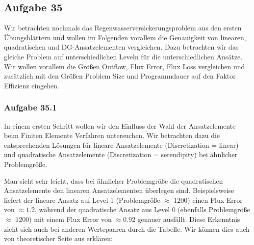 \subsection{Aufgabe 35}
Wir betrachten nochmals das Regenwasserversickerungsproblem aus den ersten Übungsblättern und wollen im Folgenden vorallem die Genauigkeit von linearen, quadratischen und DG-Ansatzelementen
vergleichen. Dazu betrachten wir das gleiche Problem auf unterschiedlichen Leveln für die unterschiedlichen Ansätze. Wir  wollen vorallem die Größen Outflow, Flux Error, Flux Loss vergleichen und zusätzlich mit den Größen Problem Size und Programmdauer auf den Faktor Effizienz eingehen.

\subsubsection{Aufgabe 35.1}
In einem ersten Schritt wollen wir den Einfluss der Wahl der Ansatzelemente beim Finiten Elemente Verfahren untersuchen.
Wir betrachten dazu die entsprechenden Lösungen für lineare Ansatzelemente (Discretization = linear) und quadratische Ansatzelemente (Discretization = serendipity) bei ähnlicher Problemgröße.
\begin{figure}[H]
	\centering
\end{figure}

\begin{figure}[H]
	\centering
\end{figure}
Man sieht sehr leicht, dass bei ähnlicher Problemgröße die quadratischen Ansatzelemente den linearen Ansatzelementen überlegen sind. Beispielsweise liefert der lineare Ansatz auf Level 1 (Problemgröße $\approx$ $1200$) einen Flux Error von $\approx 1.2$, während der quadratische Ansatz aus Level 0 (ebenfalls Problemgröße $\approx$ $1200$) mit einem Flux Error von $\approx 0.92$ genauer ausfällt. Diese Erkenntnis zieht sich auch bei anderen Wertepaaren durch die Tabelle.
Wir können dies auch von theoretischer Seite aus erklären:

